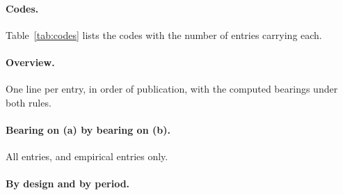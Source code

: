 \documentclass{situationist-preprint}
\begin{document}
\paragraph{Codes.} Table~\ref{tab:codes} lists the codes with the number of entries carrying each.

\begin{table}[h]\caption{Codes and their frequencies.}\label{tab:codes}

\end{table}

\paragraph{Overview.} One line per entry, in order of publication, with the computed bearings under both rules.



\paragraph{Bearing on (a) by bearing on (b).} All entries, and empirical entries only.

\begin{table}[h]\caption{Cross-tabulation of the bearings, all entries.}\label{tab:ab}

\end{table}

\begin{table}[h]\caption{Cross-tabulation of the bearings, empirical entries only.}\label{tab:abemp}

\end{table}

\paragraph{By design and by period.}

\begin{table}[h]\caption{Bearing on the mismatch thesis by design.}\label{tab:da}

\end{table}

\begin{table}[h]\caption{Bearing on the function thesis by design (lenient rule).}\label{tab:db}

\end{table}

\begin{table}[h]\caption{Bearings by period of publication.}\label{tab:period}

\end{table}
\end{document}
